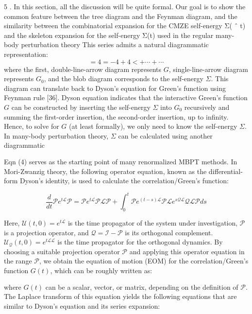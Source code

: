 \documentclass[11pt]{article} %
\begin{document}
5
. In this section, all the discussion will be quite formal. Our goal is to show the common feature between
the tree diagram and the Feynman diagram, and the similarity between the combinatorial expansion for the
CMZE self-energy Σ( ˆ t) and the skeleton expansion for the self-energy Σ(t) used in the regular many-body
perturbation theory
This series admits a natural diagrammatic representation:
$$
=4=-4+4<+\cdots+\cdots
$$
where the first, double-line-arrow diagram represents $G$, single-line-arrow diagram represents $G_0$, and the blob diagram corresponds to the self-energy $\Sigma$. This diagram can translate back to Dyson's equation for Green's function using Feynman rule [36]. Dyson equation indicates that the interactive Green's function $G$ can be constructed by inserting the self-energy $\Sigma$ into $G_0$ recursively and summing the first-order insertion, the second-order insertion, up to infinity. Hence, to solve for $G$ (at least formally), we only need to know the self-energy $\Sigma$. In many-body perturbation theory, $\Sigma$ can be calculated using another diagrammatic

Eqn (4) serves as the starting point of many renormalized MBPT methods. In Mori-Zwanzig theory, the following operator equation, known as the differential-form Dyson's identity, is used to calculate the correlation/Green's function:

\begin{equation}
\frac{d}{d t} \mathcal{P} e^{t \mathcal{L}} \mathcal{P}=\mathcal{P} e^{t \mathcal{L}} \mathcal{P} \mathcal{L} \mathcal{P}+\int_0^t \mathcal{P} e^{(t-s) \mathcal{L}} \mathcal{P} \mathcal{L} e^{s \mathcal{Q} \mathcal{L}} \mathcal{Q L} \mathcal{P} d s
\end{equation}

Here, \( \mathcal{U}(t, 0)=e^{t \mathcal{L}} \) is the time propagator of the system under investigation, \( \mathcal{P} \) is a projection operator, and \( \mathcal{Q}=\mathcal{I}-\mathcal{P} \) is its orthogonal complement. \( \mathcal{U}_{\mathcal{Q}}(t, 0)=e^{t \mathcal{L} \mathcal{L}} \) is the time propagator for the orthogonal dynamics. By choosing a suitable projection operator \( \mathcal{P} \) and applying this operator equation in the range \( \mathcal{P} \), we obtain the equation of motion (EOM) for the correlation/Green's function \( G(t) \), which can be roughly written as:



where \( G(t) \) can be a scalar, vector, or matrix, depending on the definition of \( \mathcal{P} \). The Laplace transform of this equation yields the following equations that are similar to Dyson's equation and its series expansion:
\end{document}
